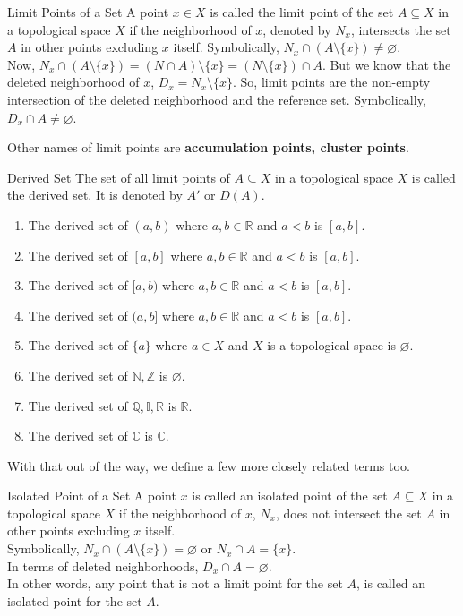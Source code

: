 \begin{Definition}{Limit Points of a Set}\label{limit_point}
    A point $x\in X$ is called the limit point of the set $A\subseteq X$ in a topological space $X$ if the neighborhood of $x$, denoted by $N_x$, intersects the set $A$ in other points excluding $x$ itself. Symbolically, $N_x\cap(A\setminus\{x\})\neq\varnothing$.\\
    Now, $N_x\cap(A\setminus\{x\})=(N\cap A)\setminus\{x\}=(N\setminus\{x\})\cap A$. But we know that the deleted neighborhood of $x$, $D_x=N_x\setminus\{x\}$. So, limit points are the non-empty intersection of the deleted neighborhood and the reference set. Symbolically, $D_x\cap A\neq\varnothing$.
\end{Definition}
\noindent Other names of limit points are \textbf{accumulation points, cluster points}.
\begin{Definition}{Derived Set}\label{derived_set}
    The set of all limit points of $A\subseteq X$ in a topological space $X$ is called the derived set. It is denoted by $A'$ or $D(A)$.
\end{Definition}
\begin{Example}\label{limit_point_drived_set_example}
    \begin{enumerate}
        \item The derived set of $(a,b)$ where $a, b\in\mathbb{R}$ and $a<b$ is $[a,b]$.
        \item The derived set of $[a,b]$ where $a, b\in\mathbb{R}$ and $a<b$ is $[a,b]$.
        \item The derived set of $[a,b)$ where $a, b\in\mathbb{R}$ and $a<b$ is $[a,b]$.
        \item The derived set of $(a,b]$ where $a, b\in\mathbb{R}$ and $a<b$ is $[a,b]$.
        \item The derived set of $\{a\}$ where $a\in X$ and $X$ is a topological space is $\varnothing$.
        \item The derived set of $\mathbb{N, Z}$ is $\varnothing$.
        \item The derived set of $\mathbb{Q, I, R}$ is $\mathbb{R}$.
        \item The derived set of $\mathbb{C}$ is $\mathbb{C}$.
    \end{enumerate}
\end{Example}
\noindent With that out of the way, we define a few more closely related terms too.
\begin{Definition}{Isolated Point of a Set}\label{isolated_point}
    A point $x$ is called an isolated point of the set $A\subseteq X$ in a topological space $ X$ if the neighborhood of $x$, $N_x$, does not intersect the set $A$ in other points excluding $x$ itself.\\ Symbolically, $N_x\cap(A\setminus\{x\})=\varnothing$ or $N_x\cap A=\{x\}$.\\
    In terms of deleted neighborhoods, $D_x\cap A=\varnothing$.\\
    In other words, any point that is not a limit point for the set $A$, is called an isolated point for the set $A$.
\end{Definition}
